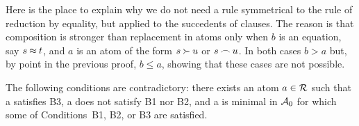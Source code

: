  Here is the place to explain why we
do not need a rule symmetrical to the rule of reduction by equality, but
applied to the succedents of clauses. The reason is that composition is
stronger than replacement in atoms only when $b$ is an equation, say
\(s\mathbin{\approx} t\), and \(a\) is an atom of the form \(s\mathbin{\succ} u\) or \(s\mathbin{\frown} u\). 
In both cases \(b>a\) but, by point  in the previous
proof, \(b\leq a\), showing that these cases are not possible.
 
\begin{LEMMA}[I3] \label{le:clauses-from-Sminus}
The following  conditions are contradictory: there exists an atom \(a\in\mbox{$\cal R$}\)
such that a satisfies B3, a does not satisfy B1 nor B2, and a is
minimal in \(\mbox{$\cal A$}_0\) for which some of Conditions~B1, B2, or B3 are
satisfied.
\end{LEMMA}
